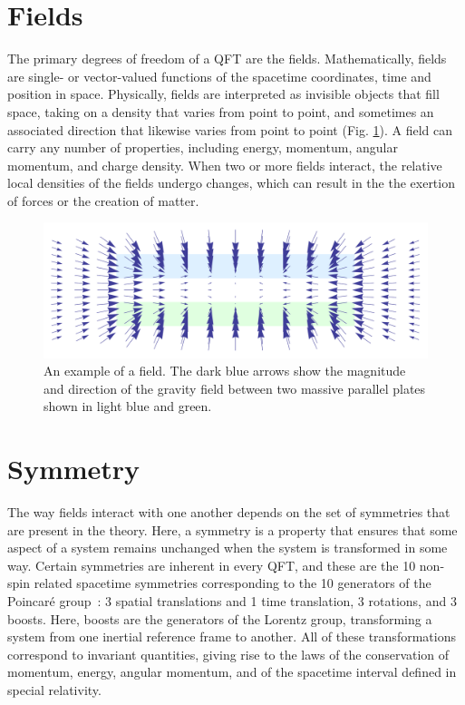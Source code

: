 \section{Fields}

The primary degrees of freedom of a QFT are the fields. Mathematically, fields are single- or vector-valued functions of the spacetime coordinates, time and position in space. Physically, fields are interpreted as invisible objects that fill  space, taking on a density that varies from point to point, and sometimes an associated direction that likewise varies from point to point (Fig. \ref{fig:field}). A field can carry any number of properties, including energy, momentum, angular momentum, and charge density. When two or more fields interact, the relative local densities of the fields undergo changes, which can result in the the exertion of forces or the creation of matter.
\begin{figure}[h]
\centering
\includegraphics[width=.95\linewidth]{figures/QFT/GField.pdf}
\caption{An example of a field. The dark blue arrows show the magnitude and direction of the gravity field between two massive parallel plates shown in light blue and green. }
\label{fig:field}
\end{figure}

\section{Symmetry}
The way fields interact with one another depends on the set of symmetries that are present in the theory. Here, a symmetry is a property that ensures that some aspect of a system remains unchanged when the system is transformed in some way. Certain symmetries are inherent in every QFT, and these are the 10 non-spin related spacetime symmetries corresponding to the 10 generators of the Poincar{\'e} group~\cite{Peskin:1995ev}: 3 spatial translations and 1 time translation, 3 rotations,  and 3 boosts. Here, boosts are the generators of the Lorentz group, transforming a system from one inertial reference frame to another. All of these transformations correspond to invariant quantities, giving rise to the laws of the conservation of momentum, energy, angular momentum, and of the spacetime interval defined in special relativity. 

